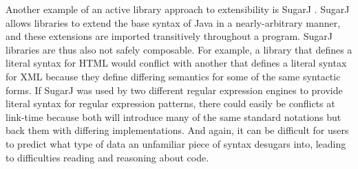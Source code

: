 Another example of an active library approach to extensibility is SugarJ \cite{sugarj}. SugarJ allows libraries to extend the base syntax of Java in a nearly-arbitrary manner, and these extensions are imported transitively throughout a program. SugarJ libraries are thus also not safely composable. For example, a library that defines a literal syntax for HTML would conflict with another that defines a literal syntax for XML because they define differing semantics for some of the same syntactic forms. If SugarJ was used by two different regular expression engines to provide literal syntax for regular expression patterns, there could easily be conflicts at link-time because both will introduce many of the same standard notations but back them with differing implementations. 
And again, it can be difficult for users to predict what type of data an unfamiliar piece of syntax desugars into, leading to difficulties reading and reasoning about code.





